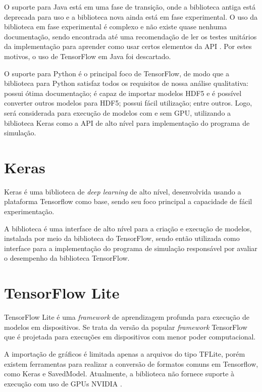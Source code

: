 O suporte para Java está em uma fase de transição, onde a biblioteca antiga está deprecada para uso e a biblioteca nova ainda está em fase experimental. O uso da biblioteca em fase experimental é complexo e não existe quase nenhuma documentação, sendo encontrada até uma recomendação de ler os testes unitários da implementação para aprender como usar certos elementos da \acrshort{API} \cite{tensorflow-unit-test-recommendation}. Por estes motivos, o uso de TensorFlow em Java foi descartado.

O suporte para Python é o principal foco de TensorFlow, de modo que a biblioteca para Python satisfaz todos os requisitos de nossa análise qualitativa: possui ótima documentação; é capaz de importar modelos HDF5 e é possível converter outros modelos para HDF5; possui fácil utilização; entre outros. Logo, será considerada para execução de modelos com e sem GPU, utilizando a biblioteca Keras como a \acrshort{API} de alto nível para implementação do programa de simulação.

\section{Keras}

Keras \cite{chollet2015keras} é uma biblioteca de \textit{deep learning} de alto nível, desenvolvida usando a plataforma Tensorflow como base, sendo seu foco principal a capacidade de fácil experimentação.

A biblioteca é uma interface de alto nível para a criação e execução de modelos, instalada por meio da biblioteca do TensorFlow, sendo então utilizada como interface para a implementação do programa de simulação responsável por avaliar o desempenho da biblioteca TensorFlow.

\section{TensorFlow Lite}
\label{tensorflow-lite}

TensorFlow Lite \cite{ml_site_tensorflow_lite} é uma \textit{framework} de aprendizagem profunda para execução de modelos em dispositivos. Se trata da versão da popular \textit{framework} TensorFlow que é projetada para execuções em dispositivos com menor poder computacional.

A importação de gráficos é limitada apenas a arquivos do tipo TFLite, porém existem ferramentas para realizar a conversão de formatos comuns em Tensorflow, como Keras e SavedModel. Atualmente, a biblioteca não fornece suporte à execução com uso de GPUs NVIDIA \cite{ml_site_tensorflow_lite_gpus}.

